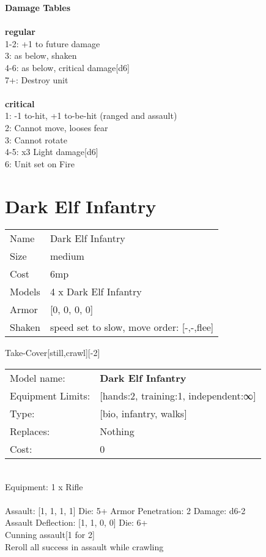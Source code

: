 {\bf Damage Tables} \\
\ \\ {\bf regular } \\
1-2: +1 to future damage \\
3: as below, shaken \\
4-6: as below, critical damage[d6] \\
7+: Destroy unit \\
\ \\ {\bf critical } \\
1: -1 to-hit, +1 to-be-hit (ranged and assault) \\
2: Cannot move, looses fear \\
3: Cannot rotate \\
4-5: x3 Light damage[d6] \\
6: Unit set on Fire \\










\pagebreak\pagebreak

\section{ Dark Elf Infantry }

\begin{tabular}{ll}
  Name & Dark Elf Infantry \\
  Size & medium\\
  Cost & 6mp\\
  Models & 4 x Dark Elf Infantry\\
  Armor & [0, 0, 0, 0]\\
  Shaken & speed set to slow, move order: [-,-,flee]\\
\end{tabular}

\noindent Take-Cover[still,crawl][-2]\\ 


\noindent
\begin{tabular}{ll}
Model name: &{\bf Dark Elf Infantry } \\
Equipment Limits: &[hands:2, training:1, independent:∞] \\
Type: &[bio, infantry, walks] \\
Replaces: &Nothing \\
Cost: & 0\\
\end{tabular}
\ \\
Equipment: 1 x Rifle \\
\ \\
Assault: [1, 1, 1, 1] Die: 5+ Armor Penetration: 2 Damage: d6-2 \\
Assault Deflection: [1, 1, 0, 0] Die: 6+\\
\indent Cunning assault[1 for 2]\\ 
Reroll all success in assault while crawling\\ 
 

